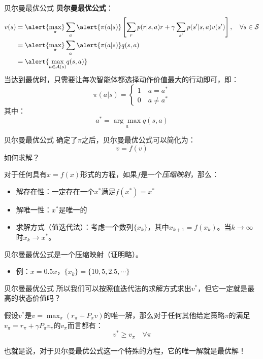 \begin{frame}{贝尔曼最优公式}
    \textbf{贝尔曼最优公式}：
    \[
        \begin{aligned}
            v(s)&=\alert{\underset{\pi}{\max}}\sum_a\alert{\pi(a|s)}\left[\sum_r p(r|s,a)r+\gamma\sum_{s'}p(s'|s,a)v(s')\right], \quad \forall s\in\mathcal{S} \\
            &=\alert{\underset{\pi}{\max}}\sum_a\alert{\pi(a|s)}q(s,a) \\
            &=\alert{\underset{a\in\mathcal{A}(s)}{\max}q(s,a)}
        \end{aligned}
    \]
    当达到最优时，只需要让每次智能体都选择动作价值最大的行动即可，即：
    \[
        \pi(a|s)=
        \begin{cases}
            1 \quad a=a^* \\
            0 \quad a\neq a^*
        \end{cases}
    \]
    其中：
    \[
        a^*=\underset{a}{\arg\max} q(s,a)
    \]
\end{frame}

\begin{frame}{贝尔曼最优公式}
    确定了$\pi$之后，贝尔曼最优公式可以简化为：
    \[
        v=f(v)
    \]
    如何求解？
    \begin{theorem}
        对于任何具有$x=f(x)$形式的方程，如果$f$是一个\textit{压缩映射}，那么：
        \begin{itemize}
            \item 解存在性：一定存在一个$x^*$满足$f(x^*)=x^*$
            \item 解唯一性：$x^*$是唯一的
            \item 求解方式（值迭代法）：考虑一个数列$\{x_k\}$，其中$x_{k+1}=f(x_k)$。当$k\rightarrow\infty$时$x_k\rightarrow x^*$。
        \end{itemize}
    \end{theorem}
    贝尔曼最优公式是一个压缩映射（证明略）。
    \begin{itemize}
        \item 例：$x=0.5x$，$\{x_k\}=\{10, 5, 2.5,\cdots\}$
    \end{itemize}
\end{frame}

\begin{frame}{贝尔曼最优公式}
    所以我们可以按照值迭代法的求解方式求出$v^*$，但它一定就是最高的状态价值吗？
    \begin{theorem}
        假设$v^*$是$v=\max_\pi(r_\pi+P_\pi v)$的唯一解，那么对于任何其他给定策略$\pi$的满足$v_\pi=r_\pi+\gamma P_\pi v_\pi$的$v_\pi$而言都有：
        \[
            v^*\geq v_\pi \quad \forall \pi
        \]
    \end{theorem}
    也就是说，对于贝尔曼最优公式这一个特殊的方程，\alert{它的唯一解就是最优解！}
\end{frame}

